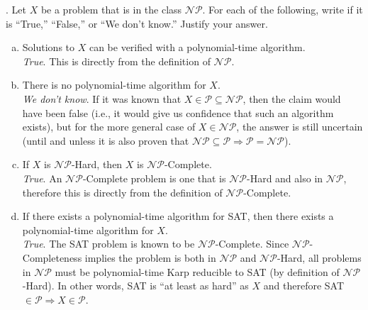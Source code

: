 \documentclass{scrartcl}
\begin{document}
    \bigskip
    . Let $X$ be a problem that is in the class $\mathcal{NP}$. For each of the following, write if
    it is ``True,'' ``False,'' or ``We don't know.'' Justify your answer.
    \begin{enumerate}[(a)]
        \item Solutions to $X$ can be verified with a polynomial-time algorithm.\\

            \textit{True}. This is directly from the definition of $\mathcal{NP}$.\\
        \item There is no polynomial-time algorithm for $X$.\\

            \textit{We don't know}. If it was known that $X \in \mathcal{P} \subseteq \mathcal{NP}$,
            then the claim would have been false (i.e., it would give us confidence that such an
            algorithm exists), but for the more general case of $X \in \mathcal{NP}$, the answer is
            still uncertain (until and unless it is also proven that $\mathcal{NP} \subseteq
            \mathcal{P} \Rightarrow \mathcal{P} = \mathcal{NP}$).\\
        \item If $X$ is $\mathcal{NP}$-Hard, then $X$ is $\mathcal{NP}$-Complete.\\

            \textit{True}. An $\mathcal{NP}$-Complete problem is one that is $\mathcal{NP}$-Hard and
            also in $\mathcal{NP}$, therefore this is directly from the definition of
            $\mathcal{NP}$-Complete.\\
        \item If there exists a polynomial-time algorithm for \textsf{SAT}, then there exists a
            polynomial-time algorithm for $X$.\\

            \textit{True}. The \textsf{SAT} problem is known to be $\mathcal{NP}$-Complete. Since
            $\mathcal{NP}$-Completeness implies the problem is both in $\mathcal{NP}$ and
            $\mathcal{NP}$-Hard, all problems in $\mathcal{NP}$ must be polynomial-time Karp
            reducible to \textsf{SAT} (by definition of $\mathcal{NP}$-Hard). In other words,
            \textsf{SAT} is ``at least as hard'' as $X$ and therefore \textsf{SAT} $\in \mathcal{P}
            \Rightarrow X \in \mathcal{P}$.
    \end{enumerate}
\end{document}
